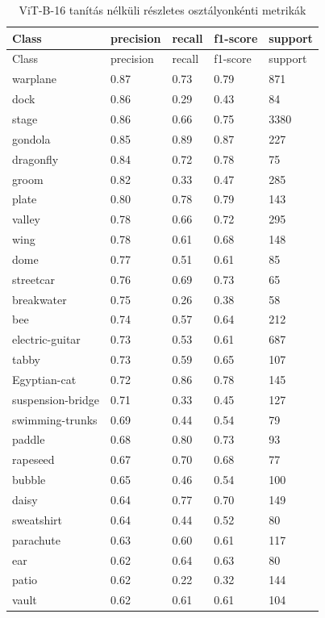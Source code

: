 \begin{center}
\begin{longtable}{lllll}
\caption{ViT-B-16 tanítás nélküli részletes osztályonkénti metrikák}\label{tab:phase1_ViT-B-16_class_table}\\
\toprule
Class & precision & recall & f1-score & support \\
\midrule
\endfirsthead
\toprule
Class & precision & recall & f1-score & support \\
\midrule
\endhead
warplane & 0.87 & 0.73 & 0.79 & 871 \\
dock & 0.86 & 0.29 & 0.43 & 84 \\
stage & 0.86 & 0.66 & 0.75 & 3380 \\
gondola & 0.85 & 0.89 & 0.87 & 227 \\
dragonfly & 0.84 & 0.72 & 0.78 & 75 \\
groom & 0.82 & 0.33 & 0.47 & 285 \\
plate & 0.80 & 0.78 & 0.79 & 143 \\
valley & 0.78 & 0.66 & 0.72 & 295 \\
wing & 0.78 & 0.61 & 0.68 & 148 \\
dome & 0.77 & 0.51 & 0.61 & 85 \\
streetcar & 0.76 & 0.69 & 0.73 & 65 \\
breakwater & 0.75 & 0.26 & 0.38 & 58 \\
bee & 0.74 & 0.57 & 0.64 & 212 \\
electric-guitar & 0.73 & 0.53 & 0.61 & 687 \\
tabby & 0.73 & 0.59 & 0.65 & 107 \\
Egyptian-cat & 0.72 & 0.86 & 0.78 & 145 \\
suspension-bridge & 0.71 & 0.33 & 0.45 & 127 \\
swimming-trunks & 0.69 & 0.44 & 0.54 & 79 \\
paddle & 0.68 & 0.80 & 0.73 & 93 \\
rapeseed & 0.67 & 0.70 & 0.68 & 77 \\
bubble & 0.65 & 0.46 & 0.54 & 100 \\
daisy & 0.64 & 0.77 & 0.70 & 149 \\
sweatshirt & 0.64 & 0.44 & 0.52 & 80 \\
parachute & 0.63 & 0.60 & 0.61 & 117 \\
ear & 0.62 & 0.64 & 0.63 & 80 \\
patio & 0.62 & 0.22 & 0.32 & 144 \\
vault & 0.62 & 0.61 & 0.61 & 104 \\

\end{longtable}
\end{center}
